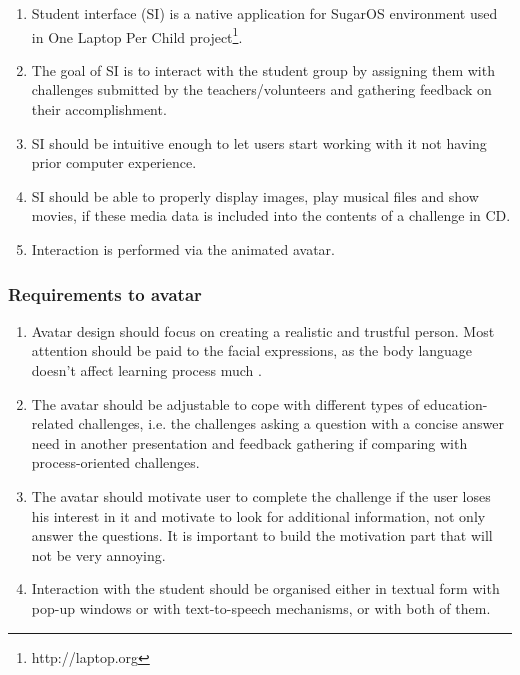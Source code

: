 \documentclass[a4paper]{article}
\begin{document}
\begin{enumerate}
\item Student interface (SI) is a native application for SugarOS environment used in One Laptop Per Child project\footnote{http://laptop.org}. 

\item The goal of SI is to interact with the student group by assigning them with challenges submitted by the teachers/volunteers and gathering feedback on their accomplishment. 

\item SI should be intuitive enough to let users start working with it not having prior computer experience.

\item SI should be able to properly display images, play musical files and show movies, if these media data is included into the contents of a challenge in CD.

\item Interaction is performed via the animated avatar.
\end{enumerate}

\subsubsection{Requirements to avatar}

\begin{enumerate}
\item Avatar design should focus on creating a realistic and trustful person. Most attention should be paid to the facial expressions, as the body language doesn't affect learning process much \cite{Cowell}.

\item The avatar should be adjustable to cope with different types of education-related challenges, i.e. the challenges asking a question with a concise answer need in another presentation and feedback gathering if comparing with process-oriented challenges.

\item The avatar should motivate user to complete the challenge if the user loses his interest in it and motivate to look for additional information, not only answer the questions. It is important to build the motivation part that will not be very annoying.

\item Interaction with the student should be organised either in textual form with pop-up windows or with text-to-speech mechanisms, or with both of them.
\end{enumerate}
\end{document}
